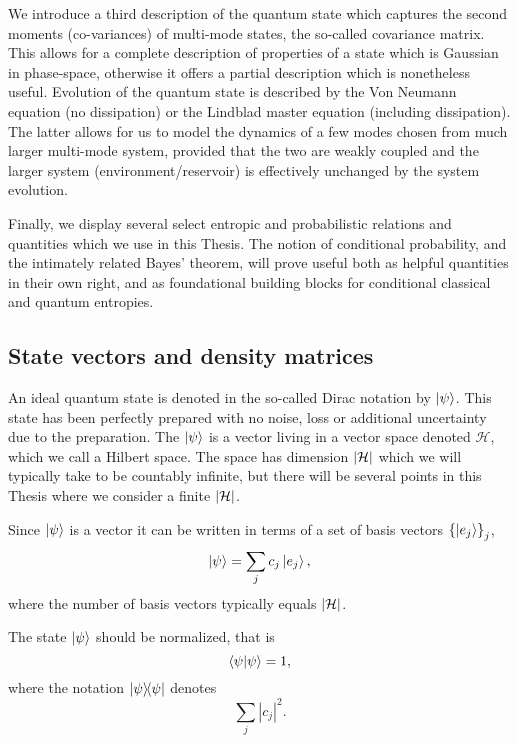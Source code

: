 We introduce a third description of the quantum state which captures the second moments (co-variances) of multi-mode states, the so-called covariance matrix. This allows for a complete description of properties of a state which is Gaussian in phase-space, otherwise it offers a partial description which is nonetheless useful. Evolution of the quantum state is described by the Von Neumann equation (no dissipation) or the Lindblad master equation (including dissipation). The latter allows for us to model the dynamics of a few modes chosen from much larger multi-mode system, provided that the two are weakly coupled and the larger system (environment/reservoir) is effectively unchanged by the system evolution. 

Finally, we display several select entropic and probabilistic relations and quantities which we use in this Thesis. The notion of conditional probability, and the intimately related Bayes' theorem, will prove useful both as helpful quantities in their own right, and as foundational building blocks for conditional classical and quantum entropies. 





\FloatBarrier
\subsection{State vectors and density matrices}\label{sec:intro_state_vectors}
An ideal quantum state is denoted in the so-called Dirac notation by $\ket{\psi}$. This state has been perfectly prepared with no noise, loss or additional uncertainty due to the preparation. The $\ket{\psi}$ is a vector living in a vector space denoted $\mathcal{H}$, which we call a Hilbert space. The space has dimension $\left|\mathcal{H}\right|$ which we will typically take to be countably infinite, but there will be several points in this Thesis where we consider a finite $\left|\mathcal{H}\right|$.

Since $\ket{\psi}$ is a vector it can be written in terms of a set of basis vectors $\left\{\ket{e_j}\right\}_j$,
\begin{equation}
\ket{\psi} = \sum_j c_j \ket{e_j},
\end{equation}
where the number of basis vectors typically equals $\left|\mathcal{H}\right|$. 

The state $\ket{\psi}$ should be normalized, that is
\begin{equation}
\ip{\psi} = 1,
\end{equation}
where the notation $\dyad{\psi}$ denotes 
\begin{equation}
\sum_j \left|c_j\right|^2.
\end{equation}

